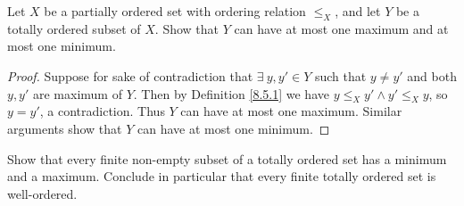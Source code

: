 \begin{exercise}\label{ex 8.5.7}
    Let \(X\) be a partially ordered set with ordering relation \(\leq_X\), and let \(Y\) be a totally ordered subset of \(X\).
    Show that \(Y\) can have at most one maximum and at most one minimum.
\end{exercise}

\begin{proof}
    Suppose for sake of contradiction that \(\exists\ y, y' \in Y\) such that \(y \neq y'\) and both \(y, y'\) are maximum of \(Y\).
    Then by Definition \ref{8.5.1} we have \(y \leq_X y' \land y' \leq_X y\), so \(y = y'\), a contradiction.
    Thus \(Y\) can have at most one maximum.
    Similar arguments show that \(Y\) can have at most one minimum.
\end{proof}

\begin{exercise}\label{ex 8.5.8}
    Show that every finite non-empty subset of a totally ordered set has a minimum and a maximum.
    Conclude in particular that every finite totally ordered set is well-ordered.
\end{exercise}

